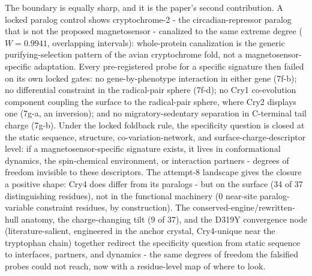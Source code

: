 \documentclass[12pt,a4paper]{article}
\begin{document}
The boundary is equally sharp, and it is the paper's second contribution. A locked paralog control shows cryptochrome-2 - the circadian-repressor paralog that is not the proposed magnetosensor - canalized to the same extreme degree ($W=0.9941$, overlapping intervals): whole-protein canalization is the generic purifying-selection pattern of the avian cryptochrome fold, not a magnetosensor-specific adaptation. Every pre-registered probe for a specific signature then failed on its own locked gates: no gene-by-phenotype interaction in either gene (7f-b); no differential constraint in the radical-pair sphere (7f-d); no Cry1 co-evolution component coupling the surface to the radical-pair sphere, where Cry2 displays one (7g-a, an inversion); and no migratory-sedentary separation in C-terminal tail charge (7g-b). Under the locked foldback rule, the specificity question is closed at the static sequence, structure, co-variation-network, and surface-charge-descriptor level: if a magnetosensor-specific signature exists, it lives in conformational dynamics, the spin-chemical environment, or interaction partners - degrees of freedom invisible to these descriptors.
The attempt-8 landscape gives the closure a positive shape: Cry4 does differ from its paralogs - but on the surface (34 of 37 distinguishing residues), not in the functional machinery (0 near-site paralog-variable constraint residues, by construction). The conserved-engine/rewritten-hull anatomy, the charge-changing tilt (9 of 37), and the D319Y convergence node (literature-salient, engineered in the anchor crystal, Cry4-unique near the tryptophan chain) together redirect the specificity question from static sequence to interfaces, partners, and dynamics - the same degrees of freedom the falsified probes could not reach, now with a residue-level map of where to look.
\end{document}
